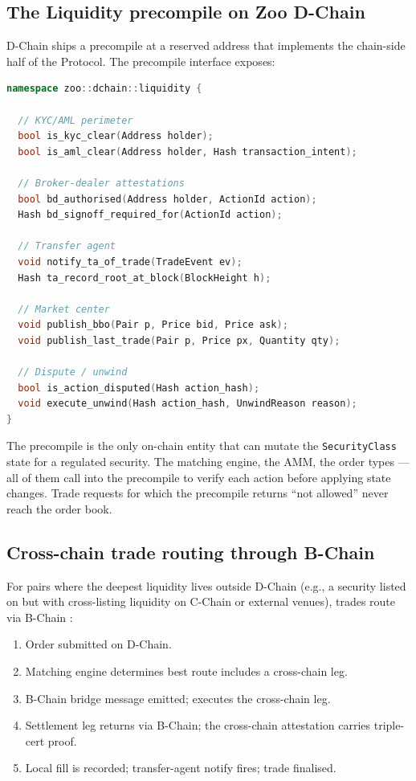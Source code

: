 \subsection{The Liquidity precompile on Zoo D-Chain}

\Zoo{} D-Chain ships a precompile at a reserved address that
implements the chain-side half of the \Liquidity{} Protocol. The
precompile interface exposes:

\begin{lstlisting}[language=C++,caption={Liquidity precompile (Zoo D-Chain)}]
namespace zoo::dchain::liquidity {

  // KYC/AML perimeter
  bool is_kyc_clear(Address holder);
  bool is_aml_clear(Address holder, Hash transaction_intent);

  // Broker-dealer attestations
  bool bd_authorised(Address holder, ActionId action);
  Hash bd_signoff_required_for(ActionId action);

  // Transfer agent
  void notify_ta_of_trade(TradeEvent ev);
  Hash ta_record_root_at_block(BlockHeight h);

  // Market center
  void publish_bbo(Pair p, Price bid, Price ask);
  void publish_last_trade(Pair p, Price px, Quantity qty);

  // Dispute / unwind
  bool is_action_disputed(Hash action_hash);
  void execute_unwind(Hash action_hash, UnwindReason reason);
}
\end{lstlisting}

The precompile is the only on-chain entity that can mutate the
\texttt{SecurityClass} state for a regulated security. The matching
engine, the AMM, the order types --- all of them call into the
precompile to verify each action before applying state changes.
Trade requests for which the precompile returns ``not allowed''
never reach the order book.

\subsection{Cross-chain trade routing through B-Chain}

For pairs where the deepest liquidity lives outside \Zoo{} D-Chain
(e.g., a security listed on \Zoo{} but with cross-listing liquidity
on \Lux{} C-Chain or external venues), trades route via B-Chain
\cite{lp-134}:

\begin{enumerate}[leftmargin=1.4em]
  \item Order submitted on \Zoo{} D-Chain.
  \item Matching engine determines best route includes a cross-chain
        leg.
  \item B-Chain bridge message emitted; \Lux{} \DEX{} \cite{lux-dex}
        executes the cross-chain leg.
  \item Settlement leg returns via B-Chain; the cross-chain attestation
        carries triple-cert proof.
  \item Local fill is recorded; transfer-agent notify fires; trade
        finalised.
\end{enumerate}

